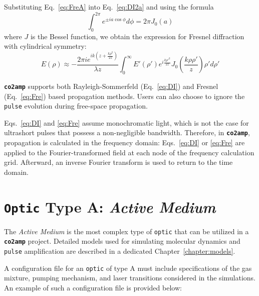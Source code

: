 Substituting Eq.~\ref{eq:FreA} into Eq.~\ref{eq:DI2a} and using the formula
\begin{equation} \label{eq:formula}
 \int_{0}^{2\pi} e^{\pm i a \cos\phi}  d\phi = 2 \pi J_0(a)
\end{equation}
where \(J\) is the Bessel function, we obtain the expression for Fresnel diffraction with cylindrical symmetry:
\begin{equation} \label{eq:Fre}
 E(\rho) \approx -\frac{2 \pi i e^{ik\left(z+\frac{k\rho^2}{2z}\right)}}{\lambda z}
 \int_0^\infty E'(\rho') e^{i\frac{k\rho'^2}{2z}} J_0 \left(\frac{k\rho\rho'}{z}\right) \rho' d\rho'
\end{equation}

\textbf{\texttt{co2amp}} supports both Rayleigh-Sommerfeld (Eq.~\ref{eq:DI}) and Fresnel (Eq.~\ref{eq:Fre}) based propagation methods. Users can also choose to ignore the \texttt{pulse} evolution during free-space propagation.

Eqs.~\ref{eq:DI} and \ref{eq:Fre} assume monochromatic light, which is not the case for ultrashort pulses that possess a non-negligible bandwidth. Therefore, in \textbf{\texttt{co2amp}}, propagation is calculated in the frequency domain: Eqs.~\ref{eq:DI} or \ref{eq:Fre} are applied to the Fourier-transformed field at each node of the frequency calculation grid. Afterward, an inverse Fourier transform is used to return to the time domain.



\section{\texttt{Optic} Type A: \textit{Active Medium}}
The \textit{Active Medium} is the most complex type of \texttt{optic} that can be utilized in a \textbf{\texttt{co2amp}} project. Detailed models used for simulating molecular dynamics and \texttt{pulse} amplification are described in a dedicated Chapter~\ref{chapter:models}.

A configuration file for an \texttt{optic} of type A must include specifications of the gas mixture, pumping mechanism, and laser transitions considered in the simulations. An example of such a configuration file is provided below:

